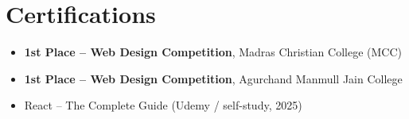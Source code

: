 \documentclass[letterpaper,10pt]{article}
\newcommand{\resumeItem}[1]{
  \item\small{{#1 \vspace{-2pt}}}
}
\newcommand{\resumeItemListStart}{\begin{itemize}[leftmargin=0.2in]\vspace{-2pt}}
\newcommand{\resumeItemListEnd}{\end{itemize}\vspace{-4pt}}
\begin{document}
\section{Certifications}
  \resumeItemListStart
   \resumeItem{\textbf{1st Place -- Web Design Competition}, Madras Christian College (MCC)}
    \resumeItem{\textbf{1st Place -- Web Design Competition}, Agurchand Manmull Jain College}
    \resumeItem{React -- The Complete Guide (Udemy / self-study, 2025)}
  \resumeItemListEnd

\end{document}
